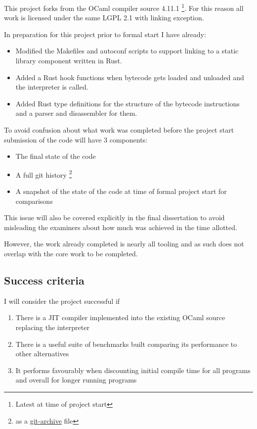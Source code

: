 \documentclass[12pt,a4paper, headings=standardclasses]{scrartcl}
\begin{document}
This project forks from the OCaml compiler source 4.11.1 \footnote{Latest at
time of project start}. For this reason all work is licensed under the same
LGPL 2.1 with linking exception.

In preparation for this project prior to formal start I have already:

\begin{itemize}
    \item Modified the Makefiles and autoconf scripts to support linking to
        a static library component written in Rust.
    \item Added a Rust hook functions when bytecode gets loaded and unloaded
        and the interpreter is called.
    \item Added Rust type definitions for the structure of the bytecode instructions
        and a parser and disassembler for them.
\end{itemize}

To avoid confusion about what work was completed before the project start
submission of the code will have 3 components:

\begin{itemize}
    \item The final state of the code
    \item A full git history \footnote{as a \href{https://git-scm.com/docs/git-archive}{git-archive} file}
    \item A snapshot of the state of the code at time of formal project start for comparisons
\end{itemize}

This issue will also be covered explicitly in the final dissertation to avoid
misleading the examiners about how much was achieved in the time allotted.

However, the work already completed is nearly all tooling and as such does
not overlap with the core work to be completed.

\subsection*{Success criteria}

I will consider the project successful if

\begin{enumerate}
    \item There is a JIT compiler implemented into the existing OCaml source
        replacing the interpreter
    \item There is a useful suite of benchmarks built comparing its
        performance to other alternatives
    \item It performs favourably when discounting initial compile time for all programs
        and overall for longer running programs
\end{enumerate}
\end{document}
